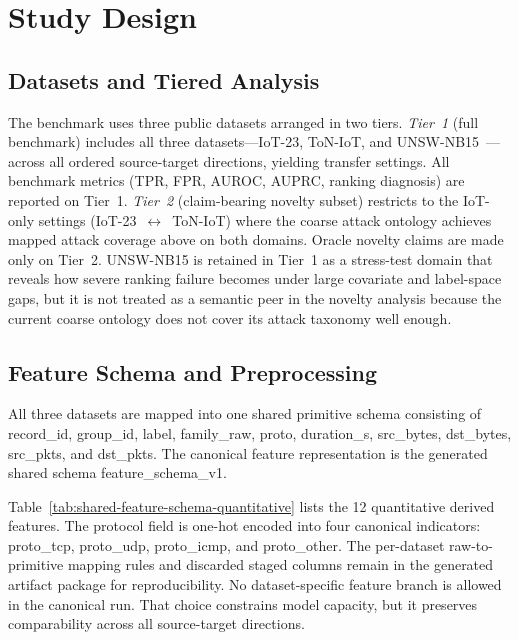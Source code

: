 \documentclass[preprint,12pt]{elsarticle}
\begin{document}
\section{Study Design}

\subsection{Datasets and Tiered Analysis}

The benchmark uses three public datasets arranged in two tiers. \emph{Tier~1} (full benchmark) includes all three datasets---IoT-23, ToN-IoT, and UNSW-NB15~\cite{garcia2020iot23,booij2022ton,moustafa2015unsw}---across all \DirectionCount{} ordered source-target directions, yielding \NaturalSettingCount{} transfer settings. All benchmark metrics (TPR, FPR, AUROC, AUPRC, ranking diagnosis) are reported on Tier~1. \emph{Tier~2} (claim-bearing novelty subset) restricts to the \PrimaryIotSettingCount{} IoT-only settings (IoT-23~$\leftrightarrow$~ToN-IoT) where the coarse attack ontology achieves mapped attack coverage above \NoveltyCoverageFloor{} on both domains. Oracle novelty claims are made only on Tier~2. UNSW-NB15 is retained in Tier~1 as a stress-test domain that reveals how severe ranking failure becomes under large covariate and label-space gaps, but it is not treated as a semantic peer in the novelty analysis because the current coarse ontology does not cover its attack taxonomy well enough.

\subsection{Feature Schema and Preprocessing}

All three datasets are mapped into one shared primitive schema consisting of record\_id, group\_id, label, family\_raw, proto, duration\_s, src\_bytes, dst\_bytes, src\_pkts, and dst\_pkts. The canonical feature representation is the generated shared schema feature\_schema\_v1.


\FloatBarrier

Table~\ref{tab:shared-feature-schema-quantitative} lists the 12 quantitative derived features. The protocol field is one-hot encoded into four canonical indicators: proto\_tcp, proto\_udp, proto\_icmp, and proto\_other. The per-dataset raw-to-primitive mapping rules and discarded staged columns remain in the generated artifact package for reproducibility. No dataset-specific feature branch is allowed in the canonical run. That choice constrains model capacity, but it preserves comparability across all source-target directions.
\end{document}
